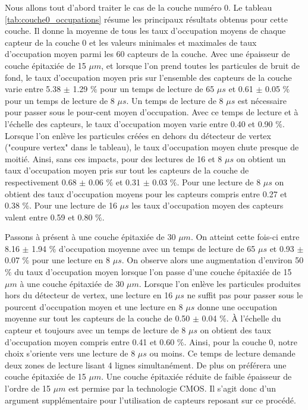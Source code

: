   Nous allons tout d'abord traiter le cas de la couche num\'ero 0. Le tableau \ref{tab:couche0_occupations} r\'esume les principaux r\'esultats obtenus pour cette couche. Il donne la moyenne de tous les taux d'occupation moyens de chaque capteur de la couche 0 et les valeurs minimales et maximales de taux d'occupation moyen parmi les 60 capteurs de la couche. Avec une \'epaisseur de couche \'epitaxi\'ee de 15 $\mu m$, et lorsque l'on prend toutes les particules de bruit de fond, le taux d'occupation moyen pris sur l'ensemble des capteurs de la couche varie entre 5.38 $\pm$ 1.29 $\%$ pour un temps de lecture de 65 $\mu s$ et 0.61 $\pm$ 0.05 $\%$ pour un temps de lecture de 8 $\mu s$. Un temps de lecture de 8 $\mu s$ est n\'ecessaire pour passer sous le pour-cent moyen d'occupation. Avec ce temps de lecture et \`a l'\'echelle des capteurs, le taux d'occupation moyen varie entre 0.40 et 0.90 $\%$. Lorsque l'on enl\`eve les particules cr\'e\'ees en dehors du d\'etecteur de vertex ("coupure vertex" dans le tableau), le taux d'occupation moyen chute presque de moiti\'e. Ainsi, sans ces impacts, pour des lectures de 16 et 8 $\mu s$ on obtient un taux d'occupation moyen pris sur tout les capteurs de la couche de respectivement 0.68 $\pm$ 0.06 $\%$ et 0.31 $\pm$ 0.03 $\%$. Pour une lecture de 8 $\mu s$ on obtient des taux d'occupation moyens pour les capteurs compris entre 0.27 et 0.38 $\%$. Pour une lecture de 16 $\mu s$ les taux d'occupation moyen des capteurs valent entre 0.59 et 0.80 $\%$.
  
  \medskip

  Passons \`a pr\'esent \`a une couche \'epitaxi\'ee de 30 $\mu m$. On atteint cette fois-ci entre 8.16 $\pm$ 1.94 $\%$ d'occupation moyenne avec un temps de lecture de 65 $\mu s$ et 0.93 $\pm$ 0.07 $\%$ pour une lecture en 8 $\mu s$. On observe alors une augmentation d'environ 50 $\%$ du taux d'occupation moyen lorsque l'on passe d'une couche \'epitaxi\'ee de 15 $\mu m$ \`a une couche \'epitaxi\'ee de 30 $\mu m$. Lorsque l'on enl\`eve les particules produites hors du détecteur de vertex, une lecture en 16 $\mu s$ ne suffit pas pour passer sous le pourcent d'occupation moyen et une lecture en 8 $\mu s$ donne une occupation moyenne sur tout les capteurs de la couche de 0.50 $\pm$ 0.04 $\%$. \`A l'\'echelle du capteur et toujours avec un temps de lecture de 8 $\mu s$ on obtient des taux d'occupation moyen compris entre 0.41 et 0.60 $\%$. Ainsi, pour la couche 0, notre choix s'oriente vers une lecture de 8 $\mu s$ ou moins. Ce temps de lecture demande deux zones de lecture lisant 4 lignes simultan\'ement. De plus on pr\'ef\'erera une couche \'epitaxi\'ee de 15 $\mu m$. Une couche \'epitaxi\'ee r\'eduite de faible \'epaisseur de l'ordre de 15 $\mu m$ est permise par la technologie CMOS. Il s'agit donc d'un argument suppl\'ementaire pour l'utilisation de capteurs reposant sur ce proc\'ed\'e.
  
